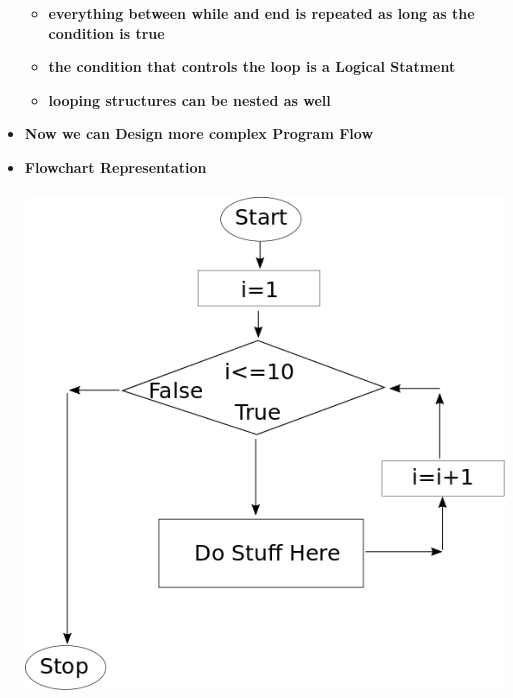 \documentclass[11pt]{article}
\newcommand{\BR}{\color{mybrown}}
\begin{document}
\begin{itemize}
\begin{itemize}
	\item \textbf{ \Large everything between  \color{black} \color{blue}while  \color{black} and \color{blue}end \color{black} is {\BR repeated} as long as the \color{mybrown} condition \color{black} is true }\vspace{5mm} \\


\item \textbf{ \Large the \color{mybrown} condition \color{black} that controls the loop is a \color{mypurple}Logical Statment} \color{black} \vspace{10mm} \\

\item \textbf{ \Large looping structures can be \color{mypurple} nested \color{black} as well}\vspace{10mm} \\

\end{itemize}
	\item \textbf{\LARGE  Now we can  \color{mypurple}Design \color{black} more complex \color{blue}Program Flow \color{black}}\\

				\newpage
				\item \textbf{\LARGE Flowchart Representation}\\\\
\includegraphics[scale=0.6]{lecture1_fig1.png}\\	


\end{itemize}
\end{document}
